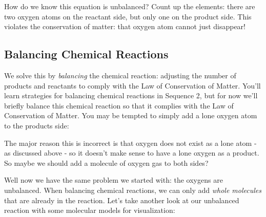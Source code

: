 \begin{center}
\end{center}

How do we know this equation is unbalanced? Count up the elements: there are two 
oxygen atoms on the reactant side, but only one on the product side. This violates 
the conservation of matter: that oxygen atom cannot just disappear!

\subsection{Balancing Chemical Reactions}
We solve this by \textit{balancing} the chemical reaction: adjusting the number 
of products and reactants to comply with the Law of Conservation of Matter. You'll
learn strategies for balancing chemical reactions in Sequence 2, but for now we'll
briefly balance this chemical reaction so that it complies with the Law of 
Conservation of Matter. You may be tempted to simply add a lone oxygen atom to 
the products side:

\begin{center}
\end{center}

The major reason this is incorrect is that oxygen does not exist as a lone atom -
as discussed above - so it doesn't make sense to have a lone oxygen as a product. 
So maybe we should add a molecule of oxygen gas to both sides?

\begin{center}
\end{center}

Well now we have the same problem we started with: the oxygens are unbalanced. 
When balancing chemical reactions, we can only add \textit{whole molecules} that 
are already in the reaction. Let's take another look at our unbalanced reaction 
with some molecular models for visualization:

